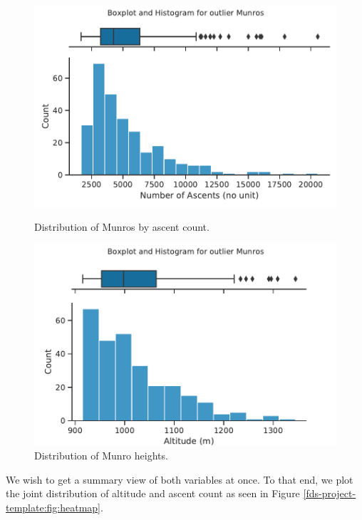 \documentclass[11pt,a4paper]{article}
\begin{document}
\begin{figure}[h!]
   \begin{minipage}{0.48\textwidth}
     \centering
     \includegraphics[width=1.2\linewidth]{report/ascent_distribution.pdf}
     \caption{Distribution of Munros by ascent count.}
     \label{fds-project-template:fig:ascent_dis}
   \end{minipage}\hfill
   \begin{minipage}{0.48\textwidth}
     \centering
     \includegraphics[width=1.2\linewidth]{report/altitude_distribution.pdf}
     \caption{Distribution of Munro heights.}
     \label{fds-project-template:fig:altitude_dis}
   \end{minipage}
\end{figure}

We wish to get a summary view of both variables at once. To that end, we plot the joint distribution of altitude and ascent count as seen in Figure \ref{fds-project-template:fig:heatmap}.
\end{document}
